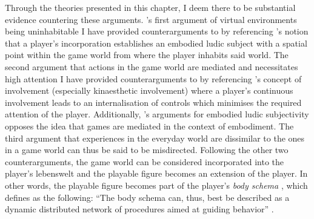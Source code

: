 Through the theories presented in this chapter, I deem there to be substantial evidence countering these arguments. \citeauthor{dourish}'s \citeyear{dourish} first argument of virtual environments being uninhabitable I have provided counterarguments to by referencing \citeauthor{vella}'s \citeyear{vella} notion that a player's incorporation \cite{calleja} establishes an embodied ludic subject with a spatial point within the game world from where the player inhabits said world. The second argument that actions in the game world are mediated and necessitates high attention I have provided counterarguments to by referencing \citeauthor{calleja}'s \citeyear{calleja} concept of involvement (especially kinaesthetic involvement) where a player's continuous involvement leads to an internalisation of controls which minimises the required attention of the player. Additionally, \citeauthor{vella}'s \citeyear{vella} arguments for embodied ludic subjectivity opposes the idea that games are mediated in the context of embodiment. The third argument that experiences in the everyday world are dissimilar to the ones in a game world can thus be said to be misdirected. Following the other two counterarguments, the game world can be considered incorporated into the player's lebenswelt and the playable figure becomes an extension of the player. In other words, the playable figure becomes part of the player's \textit{body schema} \cite{vellashort}, which  defines as the following: ``The body schema can, thus, best be described as a dynamic distributed network of procedures aimed at guiding behavior'' \cite[p. 213]{haans}.
